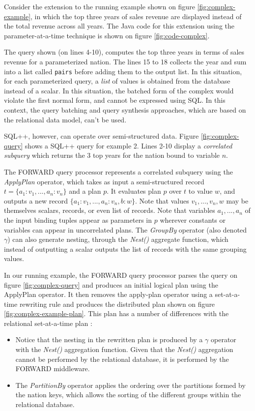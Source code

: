 Consider the extension to the running example shown on figure \ref{fig:complex-example}, in which the top three years of sales revenue are displayed instead of the total revenue across all years. The Java code for this extension using the parameter-at-a-time technique is shown on figure \ref{fig:code-complex}.

The query shown (on lines 4-10), computes the top three years in terms of sales revenue for a parameterized nation. The lines 15 to 18 collects the year and sum into a list called \texttt{pairs} before adding them to the output list. In this situation, for each parameterized query, a \emph{list} of values is obtained from the database instead of a scalar. In this situation, the batched form of the complex  would violate the first normal form, and cannot be expressed using SQL. In this context, the query batching and query synthesis approaches, which are based on the relational data model, can't be used. 

SQL++, however, can operate over semi-structured data. Figure \ref{fig:complex-query} shows a SQL++ query for example 2. Lines 2-10 display a \emph{correlated subquery} which returns the 3 top years for the nation bound to variable $n$.

The FORWARD query processor represents a correlated subquery using the \emph{ApplyPlan} operator, which takes as input a semi-structured record $t = \{a_1:v_1, ..., a_n:v_n\}$ and a plan $p$. It evaluates plan $p$ over $t$ to value $w$, and outputs a new record $\{a_1:v_1, ..., a_n:v_n, b:w\}$. Note that values $v_1, ..., v_n, w$ may be themselves scalars, records, or even list of records. Note that variables $a_1,...,a_n$ of the input binding tuples appear as parameters in $p$ wherever constants or variables can appear in uncorrelated plans. The \emph{GroupBy} operator (also denoted $\gamma$) can also generate nesting, through the \emph{Nest()} aggregate function, which instead of outputting a scalar outputs the list of records with the same grouping values. 

In our running example, the FORWARD query processor parses the query on figure \ref{fig:complex-query} and produces an initial logical plan using the ApplyPlan operator. It then removes the apply-plan operator using a set-at-a-time rewriting rule \cite{yupeng-fu:2014aa} and produces the distributed plan shown on figure \ref{fig:complex-example-plan}. This plan has a number of differences with the relational set-at-a-time plan : 

\begin{itemize}
\item{Notice that the nesting in the rewritten plan is produced by a $\gamma$ operator with the \emph{Nest()} aggregation function. Given that the \emph{Nest()} aggregation cannot be performed by the relational database, it is performed by the FORWARD middleware.}
\item{The \emph{PartitionBy} operator applies the ordering over the partitions formed by the nation keys, which allows the sorting of the different groups within the relational database.}
\end{itemize}

